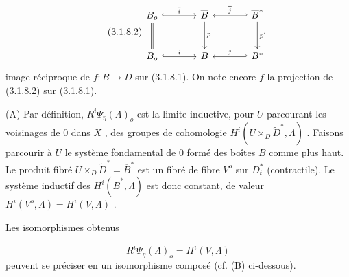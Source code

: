 \begin{equation}\tag{3.1.8.2}
\begin{tikzcd}[column sep=large, row sep=large]
B_o \arrow[r, hook, "\overline{i}"] \arrow[d, equal] & \overline{B} \arrow[d, "p"] & \overline{B}^* \arrow[l, hook', "\overline{j}"'] \arrow[d, "p'"] \\
B_o \arrow[r, hook, "i"] & B & B^* \arrow[l, hook', "j"']
\end{tikzcd}
\end{equation}
image réciproque de $f : B \longrightarrow D$ sur (3.1.8.1). On note encore $f$ la projection de (3.1.8.2) sur (3.1.8.1).

(A) Par définition, $R^i\Psi_\eta(\Lambda)_o$ est la limite inductive, pour $U$ parcourant les voisinages de $0$ dans $X$ , des groupes de cohomologie $H^i(U \times_D \widetilde{D}^*, \Lambda)$ . Faisons parcourir à $U$ le système fondamental de $0$ formé des boîtes $B$ comme plus haut. Le produit fibré $U \times_D \widetilde{D}^* = \overline{B}^*$ est un fibré de fibre $V^o$ sur $D^*_t$ (contractile). Le système inductif des $H^i(\overline{B}^*, \Lambda)$ est donc constant, de valeur $H^i(V^o, \Lambda)=H^i(V, \Lambda)$ .



Les isomorphismes obtenus

\begin{equation}\tag{3.1.8.3}
R^i\Psi_\eta(\Lambda)_o = H^i(V, \Lambda)
\end{equation}
peuvent se préciser en un isomorphisme composé (cf. (B) ci-dessous).

